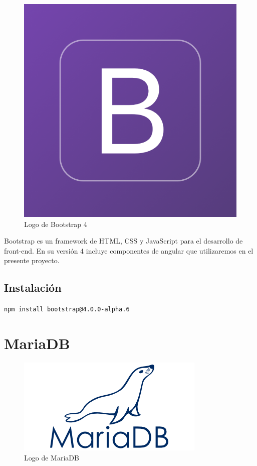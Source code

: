 \documentclass[openright,twoside,10pt]{book}
\begin{document}
    \begin{figure}[H]
        \begin{center}
            \includegraphics[scale=0.15]{img/bootstrap4.png}
        \end{center}
        \caption{Logo de Bootstrap 4}
    \end{figure}
    
    Bootstrap es un framework de HTML, CSS y JavaScript para el desarrollo
    de front-end. En su versión 4 incluye componentes de angular que
    utilizaremos en el presente proyecto.
    
    \subsection{Instalación}\label{instalaciuxf3n-3}
    
    \texttt{npm\ install\ bootstrap@4.0.0-alpha.6}
    
    \newpage
    
    \section{MariaDB}\label{mariadb}
    
    \begin{figure}[H]
        \begin{center}
            \includegraphics[scale=0.75]{img/mariadb.png}
        \end{center}
        \caption{Logo de MariaDB}
    \end{figure}
    
\end{document}
